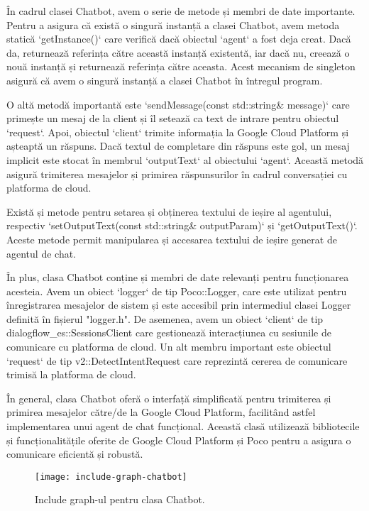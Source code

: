 În cadrul clasei Chatbot, avem o serie de metode și membri de date importante. Pentru a asigura că există o singură instanță a clasei Chatbot, avem metoda statică `getInstance()` care verifică dacă obiectul `agent` a fost deja creat. Dacă da, returnează referința către această instanță existentă, iar dacă nu, creează o nouă instanță și returnează referința către aceasta. Acest mecanism de singleton asigură că avem o singură instanță a clasei Chatbot în întregul program.

O altă metodă importantă este `sendMessage(const std::string\& message)` care primește un mesaj de la client și îl setează ca text de intrare pentru obiectul `request`. Apoi, obiectul `client` trimite informația la Google Cloud Platform și așteaptă un răspuns. Dacă textul de completare din răspuns este gol, un mesaj implicit este stocat în membrul `outputText` al obiectului `agent`. Această metodă asigură trimiterea mesajelor și primirea răspunsurilor în cadrul conversației cu platforma de cloud.

Există și metode pentru setarea și obținerea textului de ieșire al agentului, respectiv `setOutputText(const std::string\& outputParam)` și `getOutputText()`. Aceste metode permit manipularea și accesarea textului de ieșire generat de agentul de chat.

În plus, clasa Chatbot conține și membri de date relevanți pentru funcționarea acesteia. Avem un obiect `logger` de tip Poco::Logger, care este utilizat pentru înregistrarea mesajelor de sistem și este accesibil prin intermediul clasei Logger definită în fișierul "logger.h". De asemenea, avem un obiect `client` de tip dialogflow\_es::SessionsClient care gestionează interacțiunea cu sesiunile de comunicare cu platforma de cloud. Un alt membru important este obiectul `request` de tip v2::DetectIntentRequest care reprezintă cererea de comunicare trimisă la platforma de cloud.

În general, clasa Chatbot oferă o interfață simplificată pentru trimiterea și primirea mesajelor către/de la Google Cloud Platform, facilitând astfel implementarea unui agent de chat funcțional. Această clasă utilizează bibliotecile și funcționalitățile oferite de Google Cloud Platform și Poco pentru a asigura o comunicare eficientă și robustă.

\begin{figure}[h]
  \centering
  \texttt{[image: include-graph-chatbot]}
  \caption{Include graph-ul pentru clasa Chatbot.}
  \label{fig:includeGraphChatbot}
\end{figure}


